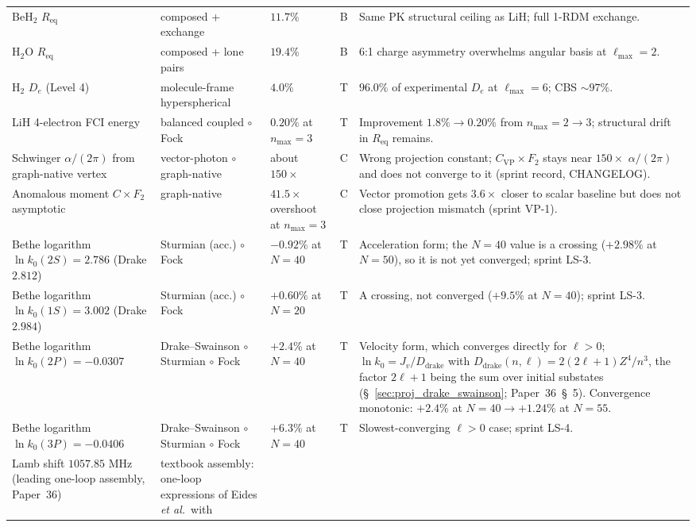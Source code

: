 \documentclass[11pt]{article}
\begin{document}
{\begin{longtable}{p{3.8cm} p{2.5cm} p{1.5cm} p{1.4cm} p{4.5cm}}
BeH$_2$ $R_{\text{eq}}$ & composed + exchange & $11.7\%$ & B &
Same PK structural ceiling as LiH; full 1-RDM exchange.
\\
H$_2$O $R_{\text{eq}}$ & composed + lone pairs & $19.4\%$ & B &
6{:}1 charge asymmetry overwhelms angular basis at $\ell_\text{max}=2$.
\\
H$_2$ $D_e$ (Level 4) & molecule-frame hyperspherical & $4.0\%$ & T
& $96.0\%$ of experimental $D_e$ at $\ell_\text{max}=6$; CBS
$\sim 97\%$. \\
LiH 4-electron FCI energy & balanced coupled $\circ$ Fock &
$0.20\%$ at $n_\text{max}=3$ & T & Improvement $1.8\% \to 0.20\%$
from $n_\text{max}=2 \to 3$; structural drift in $R_{\text{eq}}$
remains. \\
Schwinger $\alpha/(2\pi)$ from
graph-native vertex & vector-photon $\circ$ graph-native & about
$150\times$ & C & Wrong projection constant; $C_{\text{VP}} \times
F_2$ stays near $150\times$ $\alpha/(2\pi)$ and does not converge to it
(sprint record, CHANGELOG). \\
Anomalous moment $C \times F_2$ asymptotic & graph-native &
$41.5\times$ overshoot at $n_\text{max}=3$ & C & Vector promotion
gets $3.6\times$ closer to scalar baseline but does not close
projection mismatch (sprint VP-1). \\
Bethe logarithm $\ln k_0(2S) = 2.786$ (Drake $2.812$) & Sturmian (acc.) $\circ$ Fock &
$-0.92\%$ at $N=40$ & T & Acceleration form; the $N=40$ value is a crossing
($+2.98\%$ at $N=50$), so it is not yet converged; sprint LS-3. \\
Bethe logarithm $\ln k_0(1S) = 3.002$ (Drake $2.984$) & Sturmian (acc.) $\circ$ Fock &
$+0.60\%$ at $N=20$ & T & A crossing, not converged ($+9.5\%$ at $N=40$);
sprint LS-3. \\
Bethe logarithm $\ln k_0(2P) = -0.0307$ & Drake--Swainson $\circ$
Sturmian $\circ$ Fock & $+2.4\%$ at $N=40$ & T & Velocity form, which
converges directly for $\ell > 0$; $\ln k_0 = J_v / D_{\text{drake}}$ with
$D_{\text{drake}}(n,\ell) = 2(2\ell+1)Z^4/n^3$, the factor $2\ell+1$
being the sum over initial substates
(\S~\ref{sec:proj_drake_swainson}; Paper~36~\S~5).  Convergence
monotonic: $+2.4\%$ at $N=40 \to +1.24\%$ at $N=55$. \\
Bethe logarithm $\ln k_0(3P) = -0.0406$ & Drake--Swainson $\circ$
Sturmian $\circ$ Fock & $+6.3\%$ at $N=40$ & T & Slowest-converging
$\ell>0$ case; sprint LS-4. \\
Lamb shift $1057.85$ MHz (leading one-loop assembly, Paper~36) &
textbook assembly: one-loop expressions of Eides \emph{et al.}\ with

\end{longtable}}
\end{document}
